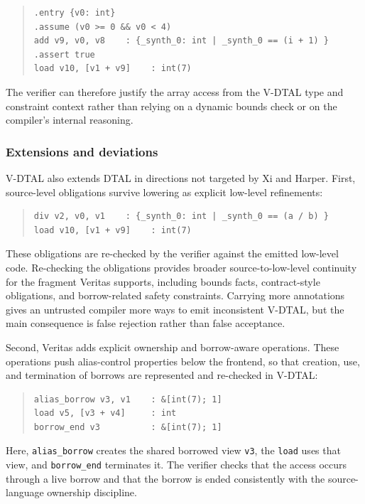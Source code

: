 \begin{quote}
  \begin{verbatim}
.entry {v0: int}
.assume (v0 >= 0 && v0 < 4)
add v9, v0, v8    : {_synth_0: int | _synth_0 == (i + 1) }
.assert true
load v10, [v1 + v9]    : int(7)
\end{verbatim}
\end{quote}

The verifier can therefore justify the array access from the V-DTAL type and constraint context rather than relying on a dynamic bounds check or on the compiler's internal reasoning.

\subsubsection{Extensions and deviations}

V-DTAL also extends DTAL in directions not targeted by Xi and Harper. First, source-level obligations survive lowering as explicit low-level refinements:
\begin{quote}
  \begin{verbatim}
div v2, v0, v1    : {_synth_0: int | _synth_0 == (a / b) }
load v10, [v1 + v9]    : int(7)
\end{verbatim}
\end{quote}
These obligations are re-checked by the verifier against the emitted low-level code. Re-checking the obligations provides broader source-to-low-level continuity for the fragment Veritas supports, including bounds facts, contract-style obligations, and borrow-related safety constraints. Carrying more annotations gives an untrusted compiler more ways to emit inconsistent V-DTAL, but the main consequence is false rejection rather than false acceptance.

Second, Veritas adds explicit ownership and borrow-aware operations. These operations push alias-control properties below the frontend, so that creation, use, and termination of borrows are represented and re-checked in V-DTAL:

\begin{quote}
  \begin{verbatim}
alias_borrow v3, v1    : &[int(7); 1]
load v5, [v3 + v4]     : int
borrow_end v3          : &[int(7); 1]
\end{verbatim}
\end{quote}

Here, \texttt{alias\_borrow} creates the shared borrowed view \texttt{v3}, the \texttt{load} uses that view, and \texttt{borrow\_end} terminates it. The verifier checks that the access occurs through a live borrow and that the borrow is ended consistently with the source-language ownership discipline.

